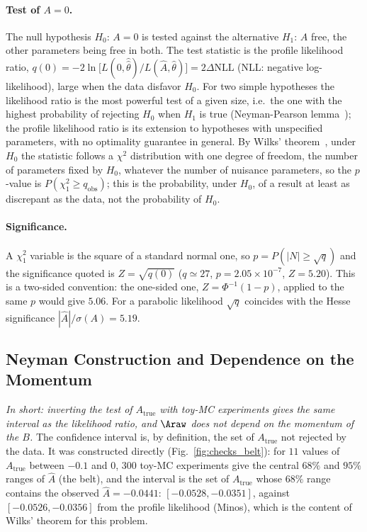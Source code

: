 \paragraph{Test of $A=0$.}
The null hypothesis $H_0$: $A=0$ is tested against the alternative $H_1$: $A$ free, the other parameters being free in both. The test statistic is the profile likelihood ratio,
$q(0)=-2\ln\big[L(0,\hat{\hat\theta})/L(\hat A,\hat\theta)\big]=2\Delta\mathrm{NLL}$ (NLL: negative log-likelihood), large when the data disfavor $H_0$. For two simple hypotheses the likelihood ratio is the most powerful test of a given size, i.e.\ the one with the highest probability of rejecting $H_0$ when $H_1$ is true (Neyman-Pearson lemma~\cite{neyman_pearson}); the profile likelihood ratio is its extension to hypotheses with unspecified parameters, with no optimality guarantee in general. By Wilks' theorem~\cite{wilks}, under $H_0$ the statistic follows a $\chi^2$ distribution with one degree of freedom, the number of parameters fixed by $H_0$, whatever the number of nuisance parameters, so the $p$-value is $P(\chi^2_1\geq q_{\mathrm{obs}})$; this is the probability, under $H_0$, of a result at least as discrepant as the data, not the probability of $H_0$.

\paragraph{Significance.}
A $\chi^2_1$ variable is the square of a standard normal one, so $p=P(|N|\geq\sqrt{q})$ and the significance quoted is $Z=\sqrt{q(0)}$ ($q\simeq27$, $p=2.05\times10^{-7}$, $Z=5.20$). This is a two-sided convention: the one-sided one, $Z=\Phi^{-1}(1-p)$, applied to the same $p$ would give $5.06$. For a parabolic likelihood $\sqrt{q}$ coincides with the Hesse significance $|\hat A|/\sigma(A)=5.19$.



\subsection{Neyman Construction and Dependence on the Momentum}
\label{sec:checks_belt}
\emph{In short: inverting the test of $A_{\mathrm{true}}$ with toy-MC experiments gives the same interval as the likelihood ratio, and $\Araw$ does not depend on the momentum of the $B$.}
The confidence interval is, by definition, the set of $A_{\mathrm{true}}$ not rejected by the data. It was constructed directly (Fig.~\ref{fig:checks_belt}): for $11$ values of $A_{\mathrm{true}}$ between $-0.1$ and $0$, $300$ toy-MC experiments give the central $68\%$ and $95\%$ ranges of $\hat A$ (the belt), and the interval is the set of $A_{\mathrm{true}}$ whose $68\%$ range contains the observed $\hat A=-0.0441$: $[-0.0528,-0.0351]$, against $[-0.0526,-0.0356]$ from the profile likelihood (Minos), which is the content of Wilks' theorem for this problem.

